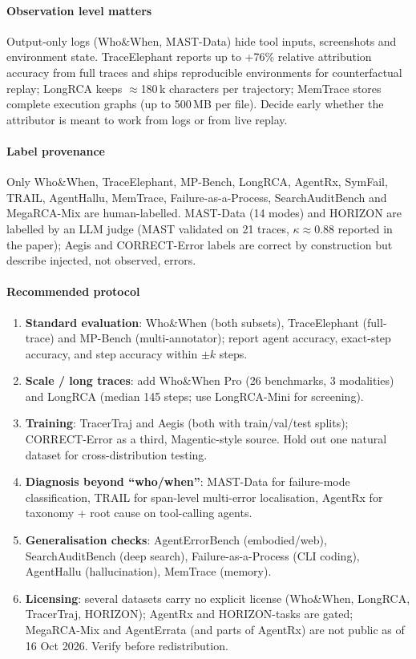 \paragraph{Observation level matters} Output-only logs (Who\&When, MAST-Data) hide tool inputs, screenshots and environment state. TraceElephant reports up to +76\% relative attribution accuracy from full traces and ships reproducible environments for counterfactual replay; LongRCA keeps $\approx$180\,k characters per trajectory; MemTrace stores complete execution graphs (up to 500\,MB per file). Decide early whether the attributor is meant to work from logs or from live replay.

\paragraph{Label provenance} Only Who\&When, TraceElephant, MP-Bench, LongRCA, AgentRx, SymFail, TRAIL, AgentHallu, MemTrace, Failure-as-a-Process, SearchAuditBench and MegaRCA-Mix are human-labelled. MAST-Data (14 modes) and HORIZON are labelled by an LLM judge (MAST validated on 21 traces, $\kappa\approx0.88$ reported in the paper); Aegis and CORRECT-Error labels are correct by construction but describe injected, not observed, errors.

\paragraph{Recommended protocol}
\begin{enumerate}[leftmargin=1.2em]
\item \textbf{Standard evaluation}: Who\&When (both subsets), TraceElephant (full-trace) and MP-Bench (multi-annotator); report agent accuracy, exact-step accuracy, and step accuracy within $\pm k$ steps.
\item \textbf{Scale / long traces}: add Who\&When Pro (26 benchmarks, 3 modalities) and LongRCA (median 145 steps; use LongRCA-Mini for screening).
\item \textbf{Training}: TracerTraj and Aegis (both with train/val/test splits); CORRECT-Error as a third, Magentic-style source. Hold out one natural dataset for cross-distribution testing.
\item \textbf{Diagnosis beyond ``who/when''}: MAST-Data for failure-mode classification, TRAIL for span-level multi-error localisation, AgentRx for taxonomy + root cause on tool-calling agents.
\item \textbf{Generalisation checks}: AgentErrorBench (embodied/web), SearchAuditBench (deep search), Failure-as-a-Process (CLI coding), AgentHallu (hallucination), MemTrace (memory).
\item \textbf{Licensing}: several datasets carry no explicit license (Who\&When, LongRCA, TracerTraj, HORIZON); AgentRx and HORIZON-tasks are gated; MegaRCA-Mix and AgentErrata (and parts of AgentRx) are not public as of 16 Oct 2026. Verify before redistribution.
\end{enumerate}
